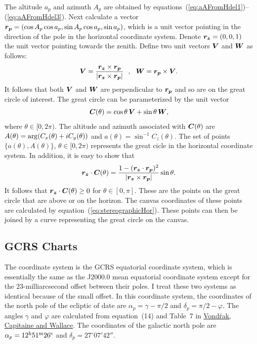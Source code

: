 \documentclass[12pt]{article}
\newcommand \beq {\begin{equation}}
\newcommand \eeq {\end{equation}}
\newcommand{\ve}[1]{\mbox{\boldmath $#1$}}
\begin{document}
The altitude $a_p$ and azimuth $A_p$ are obtained by 
equations~(\ref{eq:aAFromHdel1})--(\ref{eq:aAFromHdel3}). Next calculate a vector 
$\ve{r_p} = (\cos A_p \cos a_p, \sin A_p \cos a_p, \sin a_p)$, which is a unit 
vector pointing in the direction of the pole in the horizontal coordinate system.
Denote $\ve{r_z}=(0,0,1)$ the unit vector pointing towards the zenith. Define two 
unit vectors $\ve{V}$ and $\ve{W}$ as follows:
\beq
  \ve{V} = \frac{\ve{r_z}\times \ve{r_p}}{|\ve{r_z}\times \ve{r_p}|} \ \ , \ \ 
  \ve{W} = \ve{r_p} \times \ve{V} .
\eeq
It follows that both $\ve{V}$ and $\ve{W}$ are perpendicular to $\ve{r_p}$ and so 
are on the great circle of interest. The great circle can be parameterized by 
the unit vector
\beq
  \ve{C}(\theta) = \cos \theta \, \ve{V} + \sin \theta \, \ve{W} ,
\eeq
where $\theta \in [0,2\pi)$. The altitude and azimuth associated with 
$\ve{C}(\theta)$ are $A(\theta)={\rm arg}(C_x(\theta) + i C_y(\theta))$ and 
$a(\theta) = \sin^{-1} C_z(\theta)$. The set of points $\{ a(\theta), A(\theta) \}$, 
$\theta \in [0,2\pi)$ represents the great cicle in the horizontal coordinate 
system. In addition, it is easy to show that 
\beq
  \ve{r_z} \cdot \ve{C}(\theta) = \frac{1-(\ve{r_z}\cdot \ve{r_p})^2}
{|\ve{r_z}\times \ve{r_p}|} 
\sin \theta .
\eeq
It follows that $\ve{r_z} \cdot \ve{C}(\theta) \geq 0$ for $\theta \in [0,\pi]$. 
These are the points on the great circle that are above or on the horizon. 
The canvas coordinates of these points are calculated by 
equation~(\ref{eq:stereographicHor}). These points can then be joined by a 
curve representing the great circle on the canvas.

\subsection{GCRS Charts} 

The coordinate system is the GCRS equatorial coordinate system, which is essentially 
the same as the J2000.0 mean equatorial coordinate system except for the 
23-milliarcsecond offset between their poles. I treat these two systems 
as identical because of the small offset. In this coordinate system, the 
coordinates of the north pole of the ecliptic of date are $\alpha_p = \gamma-\pi/2$ 
and $\delta_p = \pi/2 - \varphi$. The angles $\gamma$ and $\varphi$ are 
calculated from equation~(14) and Table~7 in
\href{http://adsabs.harvard.edu/abs/2011A%26A...534A..22V}{Vond\'rak,
Capitaine and Wallace}. The coordinates of the galactic north pole are 
$\alpha_{p} = 12^{\rm h} 51^{\rm m} 26^{\rm s}$ and $\delta_{p} = 27^\circ 07' 42''$. 
\end{document}
